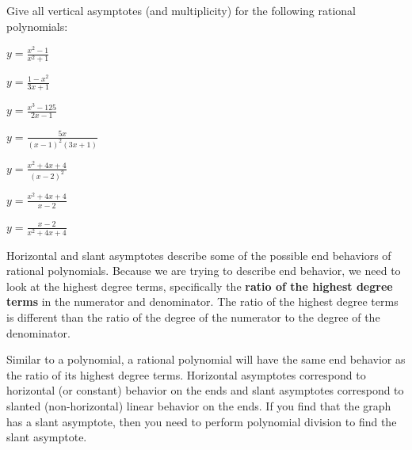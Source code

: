 \bq Give all vertical asymptotes (and multiplicity) for the following rational polynomials:
\be
\item $y=\frac{x^2-1}{x^2+1}$
\item $y=\frac{1-x^2}{3x+1}$
\item $y=\frac{x^3-125}{2x-1}$
\item $y=\frac{5x}{(x-1)^2(3x+1)}$
\item $y=\frac{x^2+4x+4}{(x-2)^2}$
\item $y=\frac{x^2+4x+4}{x-2}$
\item $y=\frac{x-2}{x^2+4x+4}$
\ee
\eq

\begin{info}
Horizontal and slant asymptotes describe some of the possible end behaviors of rational polynomials. Because we are trying to describe end behavior, we need to look at the highest degree terms, specifically the \textbf{ratio of the highest degree terms} in the numerator and denominator. The ratio of the highest degree terms is different than the ratio of the degree of the numerator to the degree of the denominator.

Similar to a polynomial, a rational polynomial will have the same end behavior as the ratio of its highest degree terms. Horizontal asymptotes correspond to horizontal (or constant) behavior on the ends and slant asymptotes correspond to slanted (non-horizontal) linear behavior on the ends. If you find that the graph has a slant asymptote, then you need to perform polynomial division to find the slant asymptote.
\end{info}

